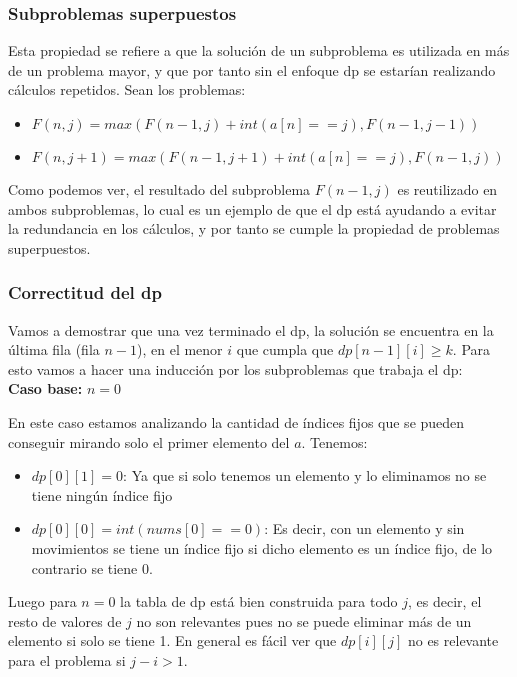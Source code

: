 \documentclass[11pt]{article}
\begin{document}
    \subsubsection{Subproblemas superpuestos}
    Esta propiedad se refiere a que la solución de un subproblema es utilizada en más de un problema mayor, y que por
    tanto sin el enfoque dp se estarían realizando cálculos repetidos. Sean los problemas:

    \begin{itemize}
        \item $F(n, j) = max(F(n-1, j) + int(a[n] == j), F(n-1, j-1))$
        \item$F(n, j+1) = max(F(n-1, j+1) + int(a[n] == j), F(n-1, j))$
    \end{itemize}

    Como podemos ver, el resultado del subproblema $F(n-1, j)$ es reutilizado en ambos subproblemas, lo cual es un
    ejemplo de que el dp está ayudando a evitar la redundancia en los cálculos, y por tanto se cumple la propiedad de
    problemas superpuestos.

    \subsubsection{Correctitud del dp}
    Vamos a demostrar que una vez terminado el dp, la solución se encuentra en la última fila (fila $n-1$), en el menor $i$
    que cumpla que $dp[n-1][i] \geq k$. Para esto vamos a hacer una inducción por los subproblemas que trabaja el
    dp:\\[10pt]

    \textbf{Caso base:} $n=0$

    En este caso estamos analizando la cantidad de índices fijos que se pueden conseguir mirando solo el primer
    elemento del $a$. Tenemos:

    \begin{itemize}
        \item $dp[0][1] = 0$: Ya que si solo tenemos un elemento y lo eliminamos no se tiene ningún índice fijo
        \item $dp[0][0] = int(nums[0] == 0)$: Es decir, con un elemento y sin movimientos se tiene un índice fijo
              si dicho elemento es un índice fijo, de lo contrario se tiene 0.
    \end{itemize}

    Luego para $n=0$ la tabla de dp está bien construida para todo $j$, es decir, el resto de valores de $j$ no
    son relevantes pues no se puede eliminar más de un elemento si solo se tiene 1. En general es fácil ver que
    $dp[i][j]$ no es relevante para el problema si $j - i > 1$.\\[10pt]
\end{document}
